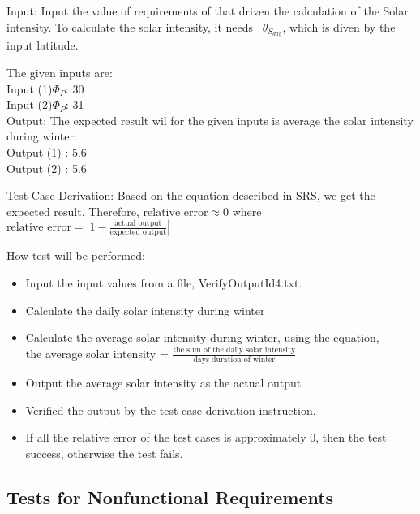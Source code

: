 \documentclass[12pt, titlepage]{article}
\begin{document}
\begin{enumerate}
 Input: Input the value of requirements of
\progname that driven the calculation of the Solar intensity. To calculate the
solar intensity, it needs ~$\theta_{S_{day}}$, which is diven by the input
latitude. 

The given inputs are:\\ 
Input (1)$\Phi_P$: 30 \\ 
Input (2)$\Phi_P$: 31\\

Output: The expected result wil for the given inputs is average the solar
intensity during winter:\\ 
Output (1) : 5.6\\ 
Output (2) : 5.6\\


Test Case Derivation: Based on the equation described in SRS\cite{YS2019}, we
get the expected result. Therefore, $\text{relative error} \approx 0$ where
$\text{relative error} = | 1 - \frac{\text{actual output}}{ \text{expected
output}} |$


How test will be performed: 

\begin{itemize} 
\item Input the input values from a file, VerifyOutputId4.txt. 
\item Calculate the daily solar intensity during winter 
\item Calculate the average solar intensity during winter, using the equation,\\the average solar intensity = $\frac{\text{the sum of the daily solar
intensity}}{\text{days duration of winter}}$
\item Output the average solar intensity as the actual output
\item Verified the output by the test case derivation instruction. 
\item If all the relative error of the test cases is approximately 0, then the
test success, otherwise the test fails.
\end{itemize}
\end{enumerate}

\subsection{Tests for Nonfunctional Requirements}
\end{document}
